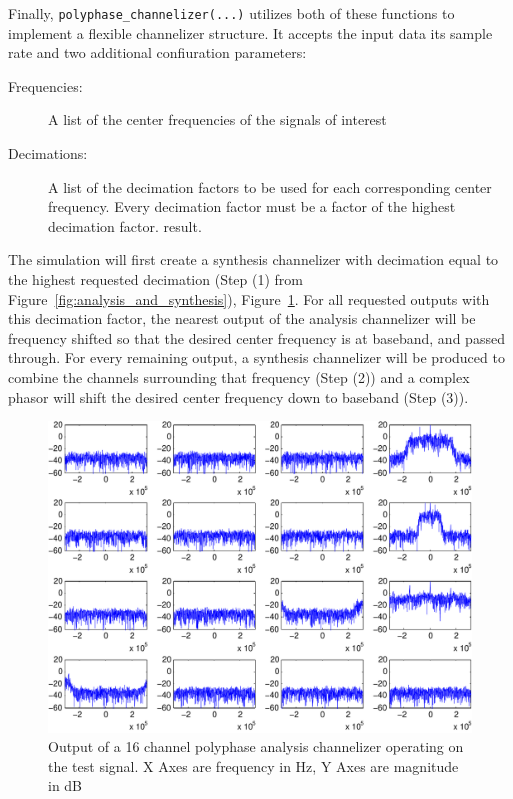 \documentclass[12pt]{report}
\begin{document}
Finally, \texttt{polyphase\_channelizer(...)} utilizes both of these functions to
implement a flexible channelizer structure.  It accepts the input data its
sample rate and two additional confiuration parameters:
\begin{description}
    \item[Frequencies:] A list of the center frequencies of the signals of interest
    \item[Decimations:] A list of the decimation factors to be used for each
        corresponding center frequency.  Every decimation factor must be
        a factor of the highest decimation factor.
    result.
\end{description}
The simulation will first create a synthesis channelizer with decimation equal
to the highest requested decimation (Step (1) from
Figure~\ref{fig:analysis_and_synthesis}), Figure~\ref{fig:polyphase_splits}.  For
all requested outputs with this decimation factor, the nearest output of the
analysis channelizer will be frequency shifted so that the desired center
frequency is at baseband, and passed through. For every remaining output,
a synthesis channelizer will be produced to combine the channels surrounding
that frequency (Step (2)) and a complex phasor will shift the desired center
frequency down to baseband (Step (3)).

\begin{figure}[h!]
    \includegraphics[width=\textwidth]{polyphase_splits}%
    \caption{Output of a 16 channel polyphase analysis channelizer operating on
             the test signal. X Axes are frequency in Hz, Y Axes are magnitude
             in dB}
    \label{fig:polyphase_splits}
\end{figure}
\end{document}
